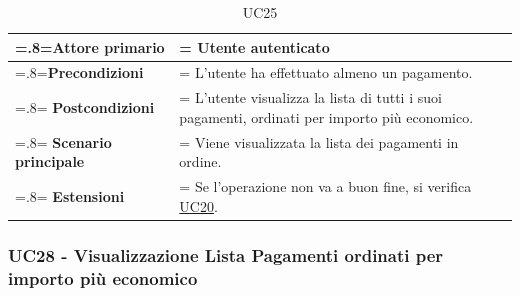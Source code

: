             \begin{table}[H]
                \centering
                \renewcommand{\arraystretch}{1.8}
                \renewcommand\tabularxcolumn[1]{m{#1}}
                \begin{tabularx}{0.9\textwidth} {
                    >{\hsize=.8\hsize\linewidth=\hsize}X
                    >{\hsize=1.2\hsize\linewidth=\hsize}X}
                    \hline
                    \textbf{Attore primario} & Utente autenticato \\
                    \hline
                    \textbf{Precondizioni} & L'utente ha effettuato almeno un pagamento. \\
                    \hline
                    \textbf{Postcondizioni} & L'utente visualizza la lista di tutti i suoi pagamenti, ordinati per importo più economico. \\
                    \hline
                    \textbf{Scenario principale} & Viene visualizzata la lista dei pagamenti in ordine. \\
                    \hline
                    \textbf{Estensioni} & Se l'operazione non va a buon fine, si verifica \hyperref[UC20]{UC20}. \\
                    \hline
                \end{tabularx}
                \caption{UC25}
            \end{table}

        \subsubsection{UC28 - Visualizzazione Lista Pagamenti ordinati per importo più economico}
        \label{UC28}


